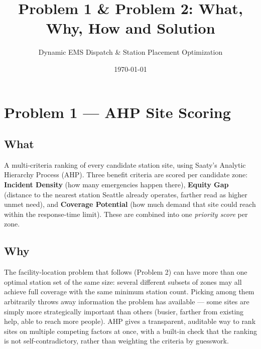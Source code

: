 \documentclass[11pt]{article}
\title{Problem 1 \& Problem 2: What, Why, How and Solution}
\author{Dynamic EMS Dispatch \& Station Placement Optimization}
\date{\today}
\begin{document}
\maketitle

\section*{Problem 1 --- AHP Site Scoring}

\subsection*{What}
A multi-criteria ranking of every candidate station site, using Saaty's
Analytic Hierarchy Process (AHP). Three benefit criteria are scored per
candidate zone: \textbf{Incident Density} (how many emergencies happen there),
\textbf{Equity Gap} (distance to the nearest station Seattle already
operates, farther read as higher unmet need), and \textbf{Coverage Potential}
(how much demand that site could reach within the response-time limit).
These are combined into one \emph{priority score} per zone.

\subsection*{Why}
The facility-location problem that follows (Problem 2) can have more than one
optimal station set of the same size: several different subsets of zones may
all achieve full coverage with the same minimum station count. Picking among
them arbitrarily throws away information the problem has available --- some
sites are simply more strategically important than others (busier, farther
from existing help, able to reach more people). AHP gives a transparent,
auditable way to rank sites on multiple competing factors at once, with a
built-in check that the ranking is not self-contradictory, rather than
weighting the criteria by guesswork.
\end{document}
